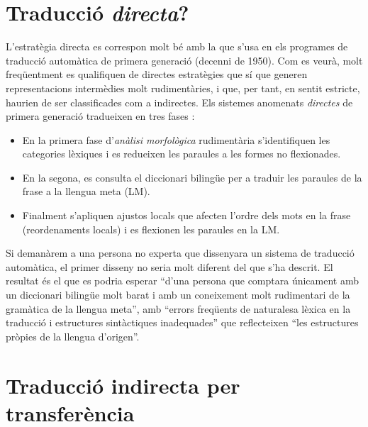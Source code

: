 \section{Traducció \emph{directa}?} 
\label{ss:traddir}
L'estratègia directa es correspon molt bé amb la que s'usa en els
programes de traducció automàtica de primera generació (decenni de
1950).  Com es veurà, molt freqüentment es qualifiquen de directes
estratègies que sí que generen representacions intermèdies molt
rudimentàries, i que, per tant, en sentit estricte, haurien de ser
classificades com a indirectes.  Els sistemes anomenats {\em
  directes} de primera generació tradueixen en tres fases
\citep[secció~4.2]{hutchins92b}:
\begin{itemize}
\item En la primera fase d'\emph{anàlisi morfològica}
rudimentària s'identifiquen les categories lèxiques i 
es redueixen les paraules a les formes no flexionades.
\item En la segona, es consulta el diccionari bilingüe per a traduir les
      paraules de la frase a la llengua meta (LM).
\item Finalment s'apliquen ajustos locals que afecten l'ordre dels
      mots en la frase (reordenaments locals) i es flexionen les
      paraules en la LM.
\end{itemize}
Si demanàrem a una persona no experta que dissenyara un sistema de
traducció automàtica, el primer disseny no seria molt diferent del que
s'ha descrit.  El resultat \citep[secció~4.2]{hutchins92b} és el que
es podria esperar ``d'una persona que comptara únicament amb un
diccionari bilingüe molt barat i amb un coneixement molt rudimentari
de la gramàtica de la llengua meta'', amb ``errors freqüents de
naturalesa lèxica en la traducció i estructures sintàctiques
inadequades'' que reflecteixen ``les estructures pròpies de la llengua
d'origen''.

  

\section{Traducció  indirecta per transferència}

